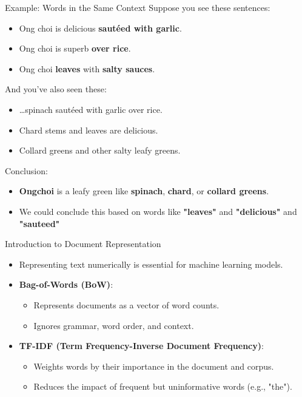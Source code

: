 \documentclass{beamer}
\begin{document}
\begin{frame}{Example: Words in the Same Context}
    Suppose you see these sentences:
    \begin{itemize}
      \item \alert{Ong choi} is delicious \textbf{sautéed with garlic}.
      \item \alert{Ong choi} is superb \textbf{over rice}.
      \item \alert{Ong choi} \textbf{leaves} with \textbf{salty sauces}.
    \end{itemize}
    And you've also seen these:
    \begin{itemize}
      \item …\alert{spinach} sautéed with garlic over rice.
      \item \alert{Chard} stems and leaves are delicious.
      \item \alert{Collard greens} and other salty leafy greens.
    \end{itemize}
    Conclusion:
    \begin{itemize}
      \item \textbf{Ongchoi} is a leafy green like \textbf{spinach}, \textbf{chard}, or \textbf{collard greens}.
      \item We could conclude this based on words like \textbf{"leaves"} and \textbf{"delicious"} and \textbf{"sauteed"}
    \end{itemize}
\end{frame}

\begin{frame}{Introduction to Document Representation}
    \begin{itemize}
        \item Representing text numerically is essential for machine learning models.
        \item \textbf{Bag-of-Words (BoW)}:
        \begin{itemize}
            \item Represents documents as a vector of word counts.
            \item Ignores grammar, word order, and context.
        \end{itemize}
        \item \textbf{TF-IDF (Term Frequency-Inverse Document Frequency)}:
        \begin{itemize}
            \item Weights words by their importance in the document and corpus.
            \item Reduces the impact of frequent but uninformative words (e.g., "the").
        \end{itemize}
    \end{itemize}
\end{frame}
\end{document}
